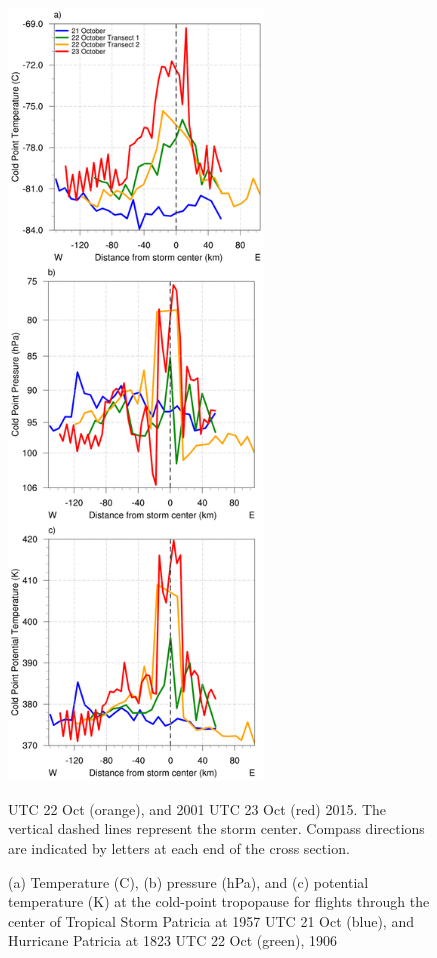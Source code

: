 \begin{figure}[ht]
\centerline{\includegraphics[width=16pc]{figures/fig03_cp_temp+theta+pres.png}}
\caption{(a) Temperature (\textdegree{}C), (b) pressure (hPa), and (c) potential temperature (K) at the cold-point tropopause for flights through the center of Tropical Storm Patricia at 1957 UTC 21 Oct (blue), and Hurricane Patricia at 1823 UTC 22 Oct (green), 1906} UTC 22 Oct (orange), and 2001 UTC 23 Oct (red) 2015. The vertical dashed lines represent the storm center. Compass directions are indicated by letters at each end of the cross section.
\label{fig:trop}
\end{figure}

